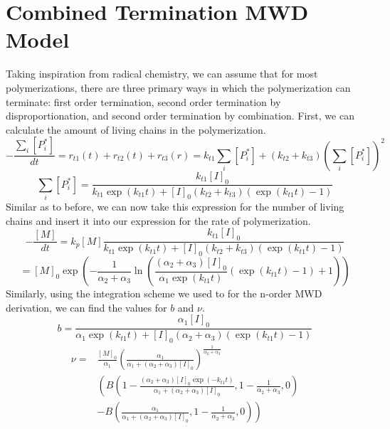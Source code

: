 \documentclass[12pt]{article}
\begin{document}
\section*{Combined Termination MWD Model}
Taking inspiration from radical chemistry, we can assume that for most polymerizations, there are three primary ways in which the polymerization can terminate: first order termination, second order termination by disproportionation, and second order termination by combination. First, we can calculate the amount of living chains in the polymerization.
\begin{equation}
  -\frac{\sum_i[P_i^*]}{dt}=r_{t1}(t)+r_{t2}(t)+r_{t3}(r) = k_{t1}\sum_i[P_i^*] + (k_{t2}+k_{t3})\left(\sum_i[P_i^*] \right)^2
\end{equation}
\begin{equation}
  \sum_i[P_i^*]=\frac{k_{t1}[I]_0}{k_{t1}\exp(k_{t1}t)+[I]_0(k_{t2}+k_{t3})(\exp(k_{t1}t)-1)}
\end{equation}
Similar as to before, we can now take this expression for the number of living chains and insert it into our expression for the rate of polymerization.
\begin{equation}
  -\frac{[M]}{dt}=k_p[M]\frac{k_{t1}[I]_0}{k_{t1}\exp(k_{t1}t)+[I]_0(k_{t2}+k_{t3})(\exp(k_{t1}t)-1)}
\end{equation}
\begin{equation}
  [M]=[M]_0\exp\left(-\frac{1}{\alpha_2+\alpha_3}\ln\left(\frac{(\alpha_{2}+\alpha_{3})[I]_0}{\alpha_{1}\exp(k_{t1}t)}(\exp(k_{t1}t)-1)+1\right)\right)
\end{equation}
Similarly, using the integration scheme we used to for the n-order MWD derivation, we can find the values for $b$ and $\nu$.
\begin{equation}
  b=\frac{\alpha_{1}[I]_0}{\alpha_{1}\exp(k_{t1}t)+[I]_0(\alpha_{2}+\alpha_{3})(\exp(k_{t1}t)-1)}
\end{equation}
\begin{equation}
  \begin{split}
    \nu= & \frac{[M]_0}{\alpha_1}\left(\frac{\alpha_1}{\alpha_1+(\alpha_2+\alpha_3)[I]_0}\right)^{\frac{1}{\alpha_2+\alpha_3}}\\
         &\left(B\left(1-\frac{(\alpha_2+\alpha_3)[I]_0\exp(-k_{t1}t)}{\alpha_1+(\alpha_2+\alpha_3)[I]_0},1-\frac{1}{\alpha_2+\alpha_3},0\right)\right.\\
         &\left.-B\left(\frac{\alpha_1}{\alpha_1+(\alpha_2+\alpha_3)[I]_0},1-\frac{1}{\alpha_2+\alpha_3},0\right)\right)
  \end{split}
\end{equation}
\end{document}
